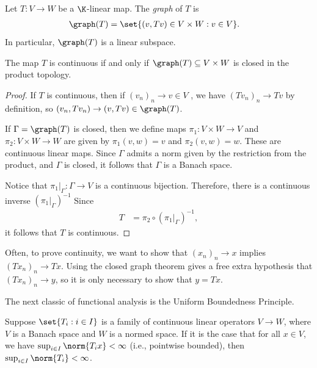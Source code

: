 \documentclass[10pt]{mypackage}
\begin{document}
Let $T\colon V\to W$ be a $\K$-linear map. The \textit{graph} of $T$ is 
\begin{align*}
  \graph(T) &= \set{\left( v,Tv \right)\in V\times W : v\in V}.
\end{align*}
In particular, $\graph(T)$ is a linear subspace.
\begin{theorem}
  The map $T$ is continuous if and only if $\graph(T)\subseteq V\times W$ is closed in the product topology.
\end{theorem}
\begin{proof}
  If $T$ is continuous, then if $\left( v_n \right)_n\to v\in V$ , we have $\left( Tv_n \right)_n\to Tv$ by definition, so $\left( v_n,Tv_n \right)\to \left( v,Tv \right)\in \graph(T)$.

  If $\Gamma = \graph(T)$ is closed, then we define maps $\pi_1\colon V\times W\to V$ and $\pi_2\colon V\times W\to W$ are given by $\pi_1(v,w) = v$ and $\pi_2(v,w) = w$. These are continuous linear maps. Since $\Gamma$ admits a norm given by the restriction from the product, and $\Gamma$ is closed, it follows that $\Gamma$ is a Banach space.

  Notice that $\pi_1|_{\Gamma}\colon \Gamma\to V$ is a continuous bijection. Therefore, there is a continuous inverse $\left( \pi_1|_{\Gamma} \right)^{-1}$ Since
  \begin{align*}
    T &= \pi_2\circ \left( \pi_1|_{\Gamma} \right)^{-1},
  \end{align*}
  it follows that $T$ is continuous.
\end{proof}
\begin{remark}
  Often, to prove continuity, we want to show that $\left( x_n \right)_n\to x$ implies $\left( Tx_n \right)_n\to Tx$. Using the closed graph theorem gives a free extra hypothesis that $\left( Tx_n \right)_n\to y$, so it is only necessary to show that $y = Tx$.
\end{remark}
The next classic of functional analysis is the Uniform Boundedness Principle.
\begin{theorem}
  Suppose $\set{T_i : i\in I}$ is a family of continuous linear operators $V \to W$, where $V$ is a Banach space and $W$ is a normed space. If it is the case that for all $x\in V$, we have $\sup_{i\in I}\norm{T_ix} < \infty$ (i.e., pointwise bounded), then $\sup_{i\in I}\norm{T_i} < \infty$.
\end{theorem}
\end{document}
